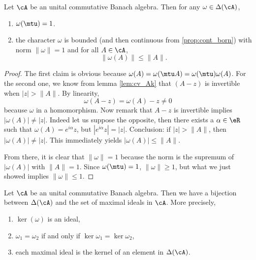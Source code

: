 \begin{proposition}
Let $\cA$ be an unital commutative Banach algebra. Then for any $\omega\in\Delta(\cA)$,
\begin{enumerate}

\item $\omega(\mtu)=1$.
\item the character $\omega$ is bounded (and then continuous from \ref{prop:cont_born}) with norm $\|\omega\|=1$ and for all $A\in\cA$,
\begin{equation} \label{eq:omAleqnA}
  \|\omega(A)\|\leq \|A\|.
\end{equation}
\end{enumerate}
\end{proposition}


\begin{proof}
The first claim is obvious because $\omega(A)=\omega(\mtu A)=\omega(\mtu)\omega(A)$.  For the second one, we know from lemma \ref{lem:cv_Ak} that $(A-z)$ is invertible when $|z|>\|A\|$. By 
linearity,
\[
\omega(A-z)=\omega(A)-z\neq 0
\]
because $\omega$ in a homomorphism. Now remark that $A-z$ is invertible implies $|\omega(A)|\neq |z|$. Indeed let us suppose the opposite, then there exists a $\alpha\in\eR$ such that $\omega(A)=e^{i\alpha}z$, but $|e^{i\alpha}z|=|z|$. Conclusion: if $|z|>\|A\|$, then $|\omega(A)|\neq|z|$. This immediately yields $|\omega(A)|\leq\|A\|$.

From there, it is clear that $\|\omega\|=1$ because the norm is the supremum of $|\omega(A)|$ with $\|A\|=1$. Since $\omega(\mtu)=1$, $\|\omega\|\geq 1$, but what we just showed implies $\|\omega\|\leq 1$.

\end{proof}

\begin{theorem}
Let $\cA$ be an unital commutative Banach algebra. Then we have a bijection between $\Delta(\cA)$ and the set of maximal ideals in $\cA$. More precisely,

\begin{enumerate}
\item $\ker(\omega)$ is an ideal,                   \label{enuei}
\item $\omega_1=\omega_2$ if and only if $\ker\omega_1=\ker\omega_2$,   \label{enueii}  
\item each maximal ideal is the kernel of an element in $\Delta(\cA)$.  \label{enueiii}
\end{enumerate}\label{tho:ideal_kernel}
\end{theorem}


